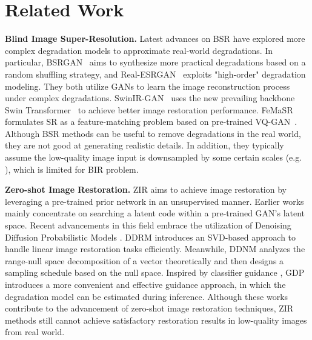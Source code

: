 \documentclass{article}
\begin{document}
\section{Related Work}
\noindent\textbf{Blind Image Super-Resolution.}
Latest advances \cite{bsr_survey} on BSR have explored more complex degradation models to approximate real-world degradations. In particular, BSRGAN~\cite{bsrgan} aims to synthesize more practical degradations based on a random shuffling strategy, and Real-ESRGAN~\cite{realesrgan} exploits "high-order" degradation modeling. They both utilize GANs \cite{gans, sngan, unetgan, srgan, esrgan} to learn the image reconstruction process under complex degradations. SwinIR-GAN~\cite{swinir} uses the new prevailing backbone Swin Transformer~\cite{swin_transformer} to achieve better image restoration performance. FeMaSR~\cite{femasr} formulates SR as a feature-matching problem based on pre-trained VQ-GAN~\cite{vqgan}.
Although BSR methods can be useful to remove degradations in the real world, they are not good at generating realistic details. In addition, they typically assume the low-quality image input is downsampled by some certain scales (e.g. ), which is limited for BIR problem.



\noindent\textbf{Zero-shot Image Restoration.}
ZIR aims to achieve image restoration by leveraging a pre-trained prior network in an unsupervised manner. Earlier works \cite{zero_shot_gan_based1, zero_shot_gan_based2, pulse, dgp} mainly concentrate on searching a latent code within a pre-trained GAN's latent space. Recent advancements in this field embrace the utilization of Denoising Diffusion Probabilistic Models \cite{ddpm, songyang1, songyang2, sd, dalle2, imagen}. DDRM \cite{ddrm} introduces an SVD-based approach to handle linear image restoration tasks efficiently. Meanwhile, DDNM \cite{ddnm} analyzes the range-null space decomposition of a vector theoretically and then designs a sampling schedule based on the null space. Inspired by classifier guidance \cite{beatsgan}, GDP \cite{gdp} introduces a more convenient and effective guidance approach, in which the degradation model can be estimated during inference. Although these works contribute to the advancement of zero-shot image restoration techniques, ZIR methods still cannot achieve satisfactory restoration results in low-quality images from real world.
\end{document}
